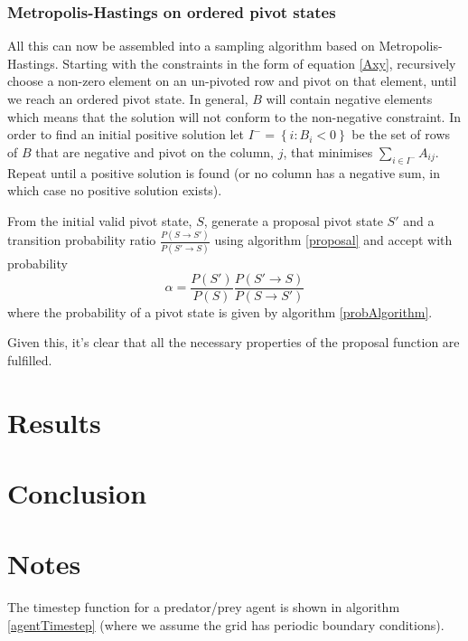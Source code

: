 \documentclass{article}
\begin{document}
\subsubsection{Metropolis-Hastings on ordered pivot states}

All this can now be assembled into a sampling algorithm based on Metropolis-Hastings. Starting with the constraints in the form of equation \ref{Axy}, recursively choose a non-zero element on an un-pivoted row and pivot on that element, until we reach an ordered pivot state. In general, $B$ will contain negative elements which means that the solution will not conform to the non-negative constraint. In order to find an initial positive solution let $I^- = \left\{i: B_i < 0\right\}$ be the set of rows of $B$ that are negative and pivot on the column, $j$, that minimises $\sum_{i\in I^-}A_{ij}$. Repeat until a positive solution is found (or no column has a negative sum, in which case no positive solution exists).

From the initial valid pivot state, $S$, generate a proposal pivot state $S'$ and a transition probability ratio $\frac{P(S\rightarrow S')}{P(S' \rightarrow S)}$ using algorithm \ref{proposal} and accept with probability
\[
\alpha = \frac{P(S')}{P(S)}\frac{P(S'\rightarrow S)}{P(S \rightarrow S')}
\]
where the probability of a pivot state is given by algorithm \ref{probAlgorithm}.

Given this, it's clear that all the necessary properties of the proposal function are fulfilled.

\section{Results}

\section{Conclusion}

\section{Notes}

The timestep function for a predator/prey agent is shown in algorithm \ref{agentTimestep} (where we assume the grid has periodic boundary conditions).
\end{document}
